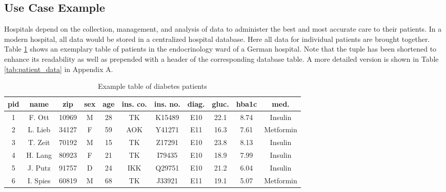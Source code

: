 \subsection{Use Case Example}
Hospitals depend on the collection, management, and analysis of data to administer the best and most accurate care to their patients. In a modern hospital, all data would be stored in a centralized hospital database. 
Here all data for individual patients are brought together. Table \ref{table:dia_patient} shows an exemplary table of patients in the endocrinology ward of a German hospital. Note that the tuple has been shortened to enhance its readability as well as prepended with a header of the corresponding database table. A more detailed version is shown in Table \ref{tab:patient_data} in Appendix A. 


\bigskip 


\begin{table}[ht]
    \begin{center}
    \footnotesize{
        \renewcommand{\arraystretch}{1.5}
        \begin{tabular}{ | c | c | c | c | c | c | c | c | c | c | c | } 
            \hline
            pid & name & zip & sex & age & ins. co. & ins. no. & diag. & gluc. & hba1c & med. \\
            \hline
            1 & F. Ott & 10969 & M & 28 & TK & K15489 & E10 & 22.1 & 8.74 & Insulin \\
            \hline
            2 & L. Lieb & 34127 & F & 59 & AOK & Y41271 & E11 & 16.3 & 7.61 & Metformin \\
            \hline 
            3 & T. Zeit & 70192 & M & 15 & TK & Z17291 & E10 & 23.8 & 8.13 & Insulin \\
            \hline
            4 & H. Lang & 80923 & F & 21 & TK & I79435 & E10 & 18.9 & 7.99 & Insulin \\
            \hline
            5 & J. Putz & 91757 & D & 24 & IKK & Q29751 & E10 & 21.2 & 6.04 & Insulin \\
            \hline
            6 & I. Spies & 60819 & M & 68 & TK & J33921 & E11 & 19.1 & 5.07 & Metformin \\
            \hline
        \end{tabular}
    }
    \caption{Example table of diabetes patients}
    \label{table:dia_patient}
    \end{center}
\end{table}

